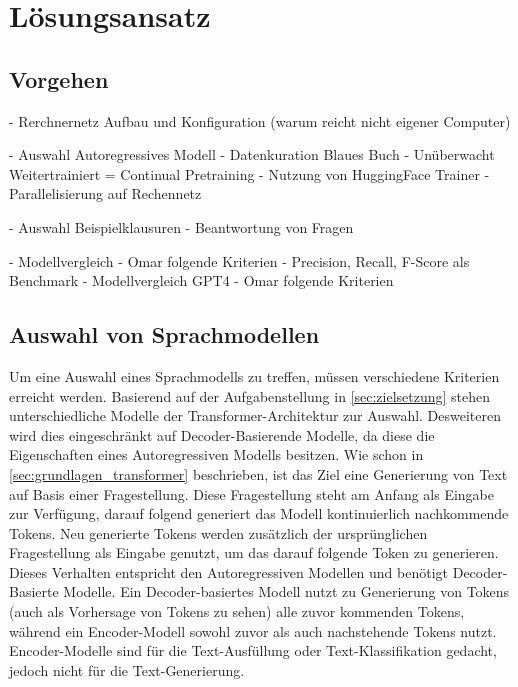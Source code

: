 \chapter{Lösungsansatz}\label{ch:approach}
\section*{Vorgehen}
- Rerchnernetz Aufbau und Konfiguration (warum reicht nicht eigener Computer)

- Auswahl Autoregressives Modell
- Datenkuration Blaues Buch
- Unüberwacht Weitertrainiert = Continual Pretraining
    - Nutzung von HuggingFace Trainer
    - Parallelisierung auf Rechennetz

- Auswahl Beispielklausuren
- Beantwortung von Fragen

- Modellvergleich
    - Omar folgende Kriterien
    - Precision, Recall, F-Score als Benchmark
- Modellvergleich GPT4
    - Omar folgende Kriterien

\section{Auswahl von Sprachmodellen}

Um eine Auswahl eines Sprachmodells zu treffen, müssen verschiedene Kriterien erreicht werden.
Basierend auf der Aufgabenstellung in \ref{sec:zielsetzung} stehen unterschiedliche Modelle der Transformer-Architektur zur Auswahl.
Desweiteren wird dies eingeschränkt auf Decoder-Basierende Modelle, da diese die Eigenschaften eines Autoregressiven Modells besitzen.
Wie schon in  \ref{sec:grundlagen_transformer} beschrieben, ist das Ziel eine Generierung von Text auf Basis einer Fragestellung.
Diese Fragestellung steht am Anfang als Eingabe zur Verfügung, darauf folgend generiert das Modell kontinuierlich nachkommende Tokens.
Neu generierte Tokens werden zusätzlich der ursprünglichen Fragestellung als Eingabe genutzt, um das darauf folgende Token zu generieren.
Dieses Verhalten entspricht den Autoregressiven Modellen und benötigt Decoder-Basierte Modelle.
Ein Decoder-basiertes Modell nutzt zu Generierung von Tokens (auch als Vorhersage von Tokens zu sehen) alle zuvor kommenden Tokens, während ein Encoder-Modell sowohl zuvor als auch nachstehende Tokens nutzt.
Encoder-Modelle sind für die Text-Ausfüllung oder Text-Klassifikation gedacht, jedoch nicht für die Text-Generierung.\\

